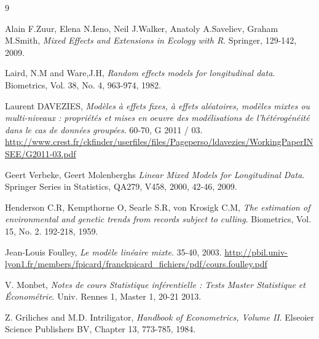 \documentclass[11pt,fleqn]{book} %
\begin{document}
	\begin{thebibliography}{9}
		
		Alain F.Zuur, Elena N.Ieno, Neil J.Walker, Anatoly A.Saveliev, Graham M.Smith,
		\emph{Mixed Effects and Extensions in Ecology with R}.
		Springer,
		129-142,
		2009.     
		
		Laird, N.M and Ware,J.H,
		\emph{Random effects models for longitudinal data}.
		Biometrics,
		Vol. 38, No. 4,
		963-974,
		1982.
		
		
		Laurent DAVEZIES,
		\emph{Modèles à effets fixes, à effets aléatoires, modèles mixtes ou multi-niveaux :
			propriétés et mises en oeuvre des modélisations
			de l’hétérogénéité dans le cas de données groupées}.
		60-70,
		G 2011 / 03.
		\url{http://www.crest.fr/ckfinder/userfiles/files/Pageperso/ldavezies/WorkingPaperINSEE/G2011-03.pdf}
		
		
		Geert Verbeke, Geert Molenberghs
		\emph{Linear Mixed Models for Longitudinal Data}.
		Springer Series in Statistics,
		QA279, V458, 2000,
		42-46,
		2009.
		
		Henderson C.R, Kempthorne O, Searle S.R, von Krosigk C.M,
		\emph{The estimation of
			environmental and genetic trends from records subject to culling}.
		Biometrics,
		Vol. 15, No. 2.
		192-218,
		1959.
		
		
		Jean-Louis Foulley,
		\emph{Le modèle linéaire mixte}.
		35-40,
		2003.
		\url{http://pbil.univ-lyon1.fr/members/fpicard/franckpicard_fichiers/pdf/cours.foulley.pdf}
		
		
		
		V. Monbet,
		\emph{Notes de cours
			Statistique inférentielle : Tests
			Master Statistique et Économétrie}.
		Univ. Rennes 1,
		Master 1,
		20-21
		2013. 
		
		
		Z. Griliches and M.D. Intriligator,
		\emph{Handbook of Econometrics, Volume II}.
		Elseoier Science Publishers BV,
		Chapter 13,
		773-785, 
		1984.
		
		
		
		
		
		
		
	\end{thebibliography}
	
	
	
	
	
	
	
\end{document}
